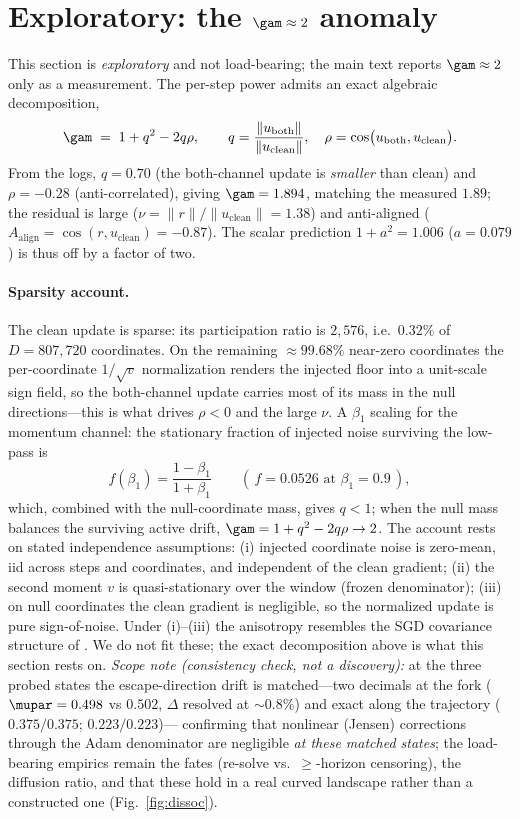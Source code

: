 \section{Exploratory: the $\gam\approx2$ anomaly}
\label{app:gamma}
This section is \emph{exploratory} and not load-bearing; the main text reports
$\gam\approx2$ only as a measurement. The per-step power admits an exact algebraic
decomposition,
\[
\gam \;=\; 1 + q^2 - 2q\rho,\qquad
q=\frac{\lVert u_{\text{both}}\rVert}{\lVert u_{\text{clean}}\rVert},\quad
\rho=\cos\!\big(u_{\text{both}},u_{\text{clean}}\big).
\]
From the logs, $q=0.70$ (the both-channel update is \emph{smaller} than clean)
and $\rho=-0.28$ (anti-correlated), giving $\gam=1.894$, matching the measured
$1.89$; the residual is large ($\nu=\lVert r\rVert/\lVert u_{\text{clean}}\rVert
=1.38$) and anti-aligned ($A_{\text{align}}=\cos(r,u_{\text{clean}})=-0.87$). The
scalar prediction $1+a^2=1.006$ ($a=0.079$) is thus off by a factor of two.

\paragraph{Sparsity account.}
The clean update is sparse: its participation ratio is $2{,}576$, i.e.\ $0.32\%$
of $D=807{,}720$ coordinates. On the remaining $\approx99.68\%$ near-zero
coordinates the per-coordinate $1/\sqrt{v}$ normalization renders the injected
floor into a unit-scale sign field, so the both-channel update carries most of
its mass in the null directions---this is what drives $\rho<0$ and the large
$\nu$. A $\beta_1$ scaling for the momentum channel: the stationary fraction of
injected noise surviving the low-pass is
\[
f(\beta_1)=\frac{1-\beta_1}{1+\beta_1}\qquad(\,f=0.0526\text{ at }\beta_1=0.9\,),
\]
which, combined with the null-coordinate mass, gives $q<1$; when the null mass
balances the surviving active drift, $\gam=1+q^2-2q\rho\to2$. The account rests on
stated independence assumptions: (i) injected coordinate noise is zero-mean, iid
across steps and coordinates, and independent of the clean gradient; (ii) the
second moment $v$ is quasi-stationary over the window (frozen denominator); (iii)
on null coordinates the clean gradient is negligible, so the normalized update is
pure sign-of-noise. Under (i)--(iii) the anisotropy resembles the SGD covariance
structure of \citet{zhu,wenfisher,ziyin}. We do not fit these; the exact
decomposition above is what this section rests on. \emph{Scope note (consistency
check, not a discovery):} at the three probed states the escape-direction drift
is matched---two decimals at the fork ($\mupar=0.498$ vs $0.502$, $\Delta$ resolved
at $\sim\!0.8\%$) and exact along the trajectory ($0.375/0.375$; $0.223/0.223$)---
confirming that nonlinear (Jensen) corrections through the Adam denominator are
negligible \emph{at these matched states}; the load-bearing empirics remain the
fates (re-solve vs.\ $\ge$-horizon censoring), the diffusion ratio, and that these
hold in a real curved landscape rather than a constructed one
(Fig.~\ref{fig:dissoc}).

